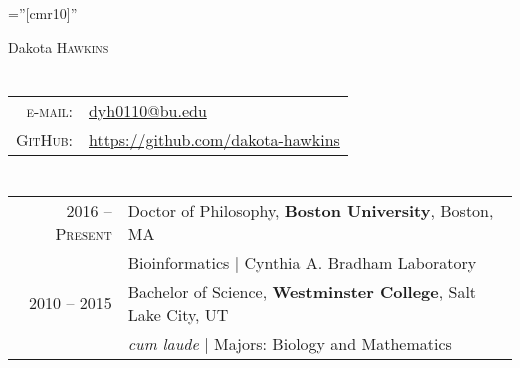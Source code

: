 \documentclass[a4paper,10pt]{article}
\begin{document}
\pagestyle{empty} %

\font\fb=''[cmr10]'' %

\par{\centering
	{\Huge Dakota \textsc{Hawkins}
	}\bigskip\par}

\section{\color{linkcolour}{Contact}}

\begin{tabular}{rl}
	\textsc{e-mail:} & \href{mailto:dyh0110@bu.edu}{dyh0110@bu.edu}                                \\
	\textsc{GitHub:} & \href{https://github.com/dakota-hawkins}{https://github.com/dakota-hawkins}
\end{tabular}

\section{\color{linkcolour}{Education}}
\begin{tabular}{rl}
	\textsc{2016 -- Present} & Doctor of Philosophy, \textbf{Boston University}, Boston, MA          \\
	                         & Bioinformatics | Cynthia A. Bradham Laboratory                        \\

	\textsc{2010 -- 2015}    & Bachelor of Science, \textbf{Westminster College}, Salt Lake City, UT \\
	                         & \emph{cum laude} | Majors: Biology and Mathematics                    \\
\end{tabular}

\end{document}
